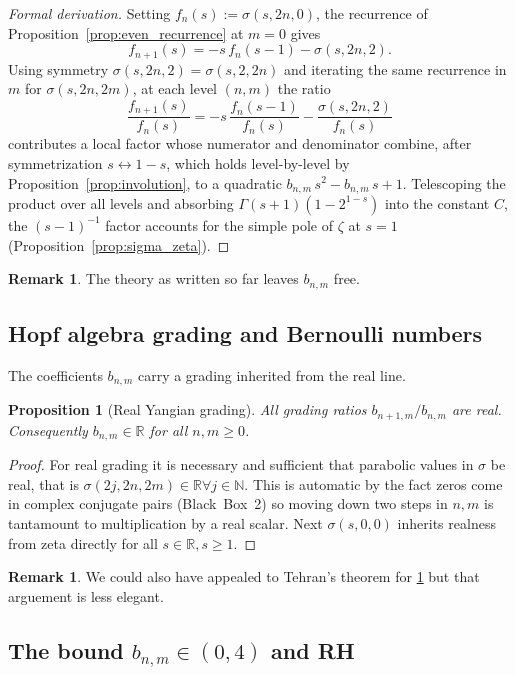 \documentclass[article]{article}
\theoremstyle{plain}
\newtheorem{proposition}[theorem]{Proposition}
\theoremstyle{definition}
\newtheorem{remark}[theorem]{Remark}
\newcommand{\R}{\mathbb{R}}
\newcommand{\N}{\mathbb{N}}
\begin{document}
\begin{proof}[Formal derivation]
Setting $f_{n}(s):=\sigma(s,2n,0)$, the recurrence of
Proposition~\ref{prop:even_recurrence} at $m=0$ gives
\[
  f_{n+1}(s)=-s\,f_{n}(s-1)-\sigma(s,2n,2).
\]
Using symmetry $\sigma(s,2n,2)=\sigma(s,2,2n)$ and iterating the same
recurrence in $m$ for $\sigma(s,2n,2m)$, at each level $(n,m)$ the ratio
\[
  \frac{f_{n+1}(s)}{f_{n}(s)}
  =-s\,\frac{f_{n}(s-1)}{f_{n}(s)}-\frac{\sigma(s,2n,2)}{f_{n}(s)}
\]
contributes a local factor whose numerator and denominator combine, after
symmetrization $s\leftrightarrow 1-s$, which holds level-by-level by
Proposition~\ref{prop:involution}, to a quadratic $b_{n,m}\,s^{2}-b_{n,m}\,s+1$.
Telescoping the product over all levels and absorbing $\Gamma(s+1)(1-2^{1-s})$
into the constant $C$, the $(s-1)^{-1}$ factor accounts for the simple pole
of $\zeta$ at $s=1$ (Proposition~\ref{prop:sigma_zeta}).
\end{proof}
\begin{remark}
The theory as written so far leaves $b_{n,m}$ free.
\end{remark}
\subsection{Hopf algebra grading and Bernoulli numbers}

The coefficients $b_{n,m}$ carry a grading inherited from the real line.

\begin{proposition}[Real Yangian grading]\label{prop:yangian_real}
All grading ratios $b_{n+1,m}/b_{n,m}$ are real.
Consequently $b_{n,m}\in\R$ for all $n,m\ge 0$.
\end{proposition}

\begin{proof}
For real grading it is necessary and sufficient that parabolic values in $\sigma$ be real, that is $\sigma(2j,2n,2m)\in\R \forall j \in \N$.
This is automatic by the fact zeros come in complex conjugate pairs (Black~Box~2) so moving down two steps in $n,m$ is tantamount to multiplication by a real scalar.
Next $\sigma(s,0,0)$ inherits realness from zeta directly for all $s\in\R, s\ge 1$. 
\end{proof}
\begin{remark}
We could also have appealed to Tehran's theorem \cite{alma991086073176506532} for \ref{prop:yangian_real} but that arguement is less elegant. 
\end{remark}
\subsection{The bound $b_{n,m}\in(0,4)$ and RH}
\end{document}
